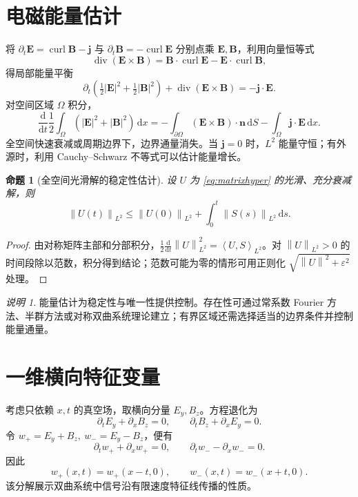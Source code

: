 \documentclass[UTF8,11pt,openany]{ctexbook}
\numberwithin{equation}{chapter}
\newtheorem{proposition}[theorem]{命题}
\theoremstyle{definition}
\theoremstyle{remark}
\newtheorem{remark}[theorem]{说明}
\newcommand{\dd}{\mathrm d}
\newcommand{\Div}{\operatorname{div}}
\newcommand{\curl}{\operatorname{curl}}
\newcommand{\norm}[1]{\left\lVert #1\right\rVert}
\newcommand{\ip}[2]{\left\langle #1,#2\right\rangle}
\begin{document}
\section{电磁能量估计}
将 $\partial_t\bm E=\curl\bm B-\bm j$ 与 $\partial_t\bm B=-\curl\bm E$ 分别点乘 $\bm E,\bm B$，利用向量恒等式
\begin{equation}
\Div(\bm E\times\bm B)=\bm B\cdot\curl\bm E-\bm E\cdot\curl\bm B,
\end{equation}
得局部能量平衡
\begin{equation}\label{eq:poynting}
\boxed{\partial_t\left(\tfrac12|\bm E|^2+\tfrac12|\bm B|^2\right)
+\Div(\bm E\times\bm B)=-\bm j\cdot\bm E.}
\end{equation}
对空间区域 $\Omega$ 积分，
\begin{equation}\label{eq:energyintegral}
\frac{\dd}{\dd t}\frac12\int_\Omega(|\bm E|^2+|\bm B|^2)\,\dd x
=-\int_{\partial\Omega}(\bm E\times\bm B)\cdot\bm n\,\dd S
-\int_\Omega\bm j\cdot\bm E\,\dd x.
\end{equation}
全空间快速衰减或周期边界下，边界通量消失。当 $\bm j=0$ 时，$L^2$ 能量守恒；有外源时，利用 Cauchy--Schwarz 不等式可以估计能量增长。

\begin{proposition}[全空间光滑解的稳定性估计]
设 $U$ 为 \eqref{eq:matrixhyper} 的光滑、充分衰减解，则
\begin{equation}\label{eq:energyestimate}
\norm{U(t)}_{L^2}\leq\norm{U(0)}_{L^2}+\int_0^t\norm{S(s)}_{L^2}\,\dd s.
\end{equation}
\end{proposition}
\begin{proof}
由对称矩阵主部和分部积分，$\tfrac12\frac{\dd}{\dd t}\norm U_{L^2}^2=\ip{U}{S}_{L^2}$。对 $\norm U_{L^2}>0$ 的时间段除以范数，积分得到结论；范数可能为零的情形可用正则化 $\sqrt{\norm U^2+\varepsilon^2}$ 处理。
\end{proof}
\begin{remark}
能量估计为稳定性与唯一性提供控制。存在性可通过常系数 Fourier 方法、半群方法或对称双曲系统理论建立；有界区域还需选择适当的边界条件并控制能量通量。
\end{remark}

\section{一维横向特征变量}
考虑只依赖 $x,t$ 的真空场，取横向分量 $E_y,B_z$。方程退化为
\begin{equation}\label{eq:1dwave}
\partial_tE_y+\partial_xB_z=0,
\qquad \partial_tB_z+\partial_xE_y=0.
\end{equation}
令 $w_+=E_y+B_z,\ w_-=E_y-B_z$，便有
\begin{equation}
\partial_tw_++\partial_xw_+=0,
\qquad
\partial_tw_- -\partial_xw_-=0.
\end{equation}
因此
\begin{equation}
w_+(x,t)=w_+(x-t,0),\qquad
w_-(x,t)=w_-(x+t,0).
\end{equation}
该分解展示双曲系统中信号沿有限速度特征线传播的性质。
\end{document}
